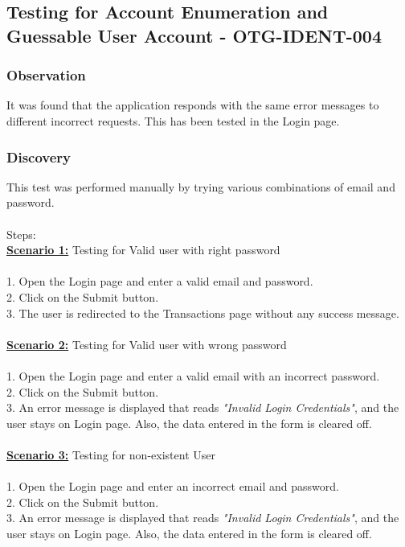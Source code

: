 \subsection{Testing for Account Enumeration and Guessable User Account - OTG-IDENT-004}

\subsubsection{Observation}
It was found that the application responds with the same error messages to different incorrect requests. This has been tested in the Login page.

\subsubsection{Discovery}
This test was performed manually by trying various combinations of email and password. \\
\\Steps: \\
\underline{\textbf{Scenario 1:}} Testing for Valid user with right password \\
\\1. Open the Login page and enter a valid email and password. \\
2. Click on the Submit button. \\
3. The user is redirected to the Transactions page without any success message. \\
\\\underline{\textbf{Scenario 2:}} Testing for Valid user with wrong password \\
\\1. Open the Login page and enter a valid email with an incorrect password. \\
2. Click on the Submit button. \\
3. An error message is displayed that reads \textit{"Invalid Login Credentials"}, and the user stays on Login page. Also, the data entered in the form is cleared off.\\
\\\underline{\textbf{Scenario 3:}} Testing for non-existent User\\
\\1. Open the Login page and enter an incorrect email and password. \\
2. Click on the Submit button. \\
3. An error message is displayed that reads \textit{"Invalid Login Credentials"}, and the user stays on Login page. Also, the data entered in the form is cleared off.\\

